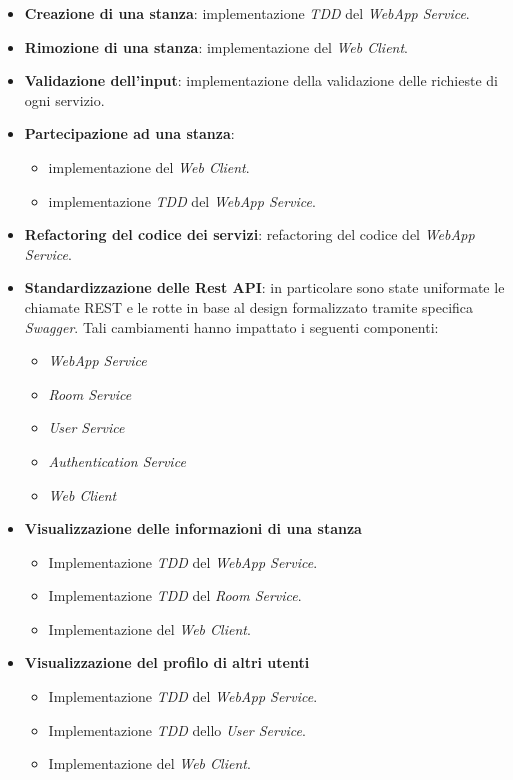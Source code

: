 \begin{itemize}
     \item \textbf{Creazione di una stanza}: implementazione \textit{TDD} del \textit{WebApp Service}.
     
     \item \textbf{Rimozione di una stanza}: implementazione del \textit{Web Client}.
    
    \item \textbf{Validazione dell'input}: implementazione della validazione delle richieste di ogni servizio.
    
    \item \textbf{Partecipazione ad una stanza}:
        \begin{itemize}
            \item implementazione del \textit{Web Client}.
            \item implementazione \textit{TDD} del \textit{WebApp Service}.
        \end{itemize}
        
    \item \textbf{Refactoring del codice dei servizi}: refactoring del codice del \textit{WebApp Service}.
    
    \item \textbf{Standardizzazione delle Rest API}: in particolare sono state uniformate le chiamate REST e le rotte in base al design formalizzato tramite specifica \textit{Swagger}. Tali cambiamenti hanno impattato i seguenti componenti:
        \begin{itemize}
            \item \textit{WebApp Service}
            \item \textit{Room Service}
            \item \textit{User Service}
            \item \textit{Authentication Service}
            \item \textit{Web Client}
        \end{itemize}
    
    \item \textbf{Visualizzazione delle informazioni di una stanza}
    \begin{itemize}
        \item Implementazione \textit{TDD} del \textit{WebApp Service}.
        \item Implementazione \textit{TDD} del \textit{Room Service}.
        \item Implementazione del \textit{Web Client}.
    \end{itemize}
    
    \item \textbf{Visualizzazione del profilo di altri utenti}
    \begin{itemize}
        \item Implementazione \textit{TDD} del \textit{WebApp Service}.
        \item Implementazione \textit{TDD} dello \textit{User Service}.
        \item Implementazione del \textit{Web Client}.
    \end{itemize}
    
\end{itemize}



